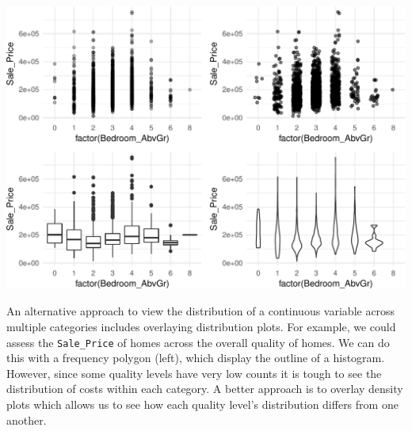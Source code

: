 \documentclass[]{article}
\begin{document}
\begin{center}\includegraphics{Chapter_3_-_Visualization_files/figure-latex/int_scatter-1} \end{center}

An alternative approach to view the distribution of a continuous
variable across multiple categories includes overlaying distribution
plots. For example, we could assess the \texttt{Sale\_Price} of homes
across the overall quality of homes. We can do this with a frequency
polygon (left), which display the outline of a histogram. However, since
some quality levels have very low counts it is tough to see the
distribution of costs within each category. A better approach is to
overlay density plots which allows us to see how each quality level's
distribution differs from one another.
\end{document}
